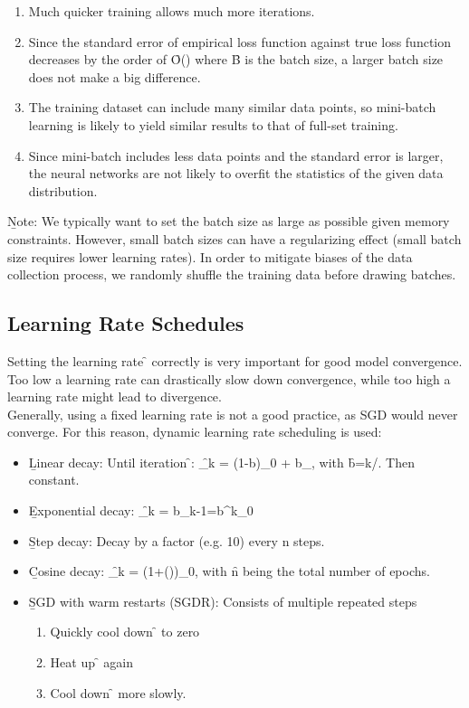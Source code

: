 \begin{enumerate}
    \item Much quicker training allows much more iterations.
    \item Since the standard error of empirical loss function against true loss function decreases by the order of \f{O()} where \f{B} is the batch size, a larger batch size does not make a big diﬀerence.
    \item The training dataset can include many similar data points, so mini-batch learning is likely to yield similar results to that of full-set training.
    \item Since mini-batch includes less data points and the standard error is larger, the neural networks are not likely to overfit the statistics of the given data distribution.
\end{enumerate}

\b{Note:} We typically want to set the batch size as large as possible given memory constraints. However, small batch sizes can have a regularizing effect (small batch size requires lower learning rates). In order to mitigate biases of the data collection process, we randomly shuffle the training data before drawing batches.

\subsection{Learning Rate Schedules}
Setting the learning rate \f{\alpha} correctly is very important for good model convergence. Too low a learning rate can drastically slow down convergence, while too high a learning rate might lead to divergence.\\[0.5em]
Generally, using a fixed learning rate is not a good practice, as SGD would never converge. For this reason, dynamic learning rate scheduling is used:
\begin{itemize}
    \item \b{Linear decay:} Until iteration \f{\tau}: \f{\alpha_k = (1-b)\alpha_0 + b\alpha_\tau,} with \f{b=k/\tau}. Then constant.
    \item \b{Exponential decay:} \f{\alpha_k = b\alpha_{k-1}=b^k\alpha_0}
    \item \b{Step decay:} Decay by a factor (e.g. 10) every n steps.
    \item \b{Cosine decay:} \f{\alpha_k = (1+\cos(\pi))\times \alpha_0}, with \f{n} being the total number of epochs.
    \item \b{SGD with warm restarts (SGDR):} Consists of multiple repeated steps
    \begin{enumerate}
        \item Quickly cool down \f{\alpha} to zero
        \item Heat up \f{\alpha} again
        \item Cool down \f{\alpha} more slowly.
    \end{enumerate}
\end{itemize}

